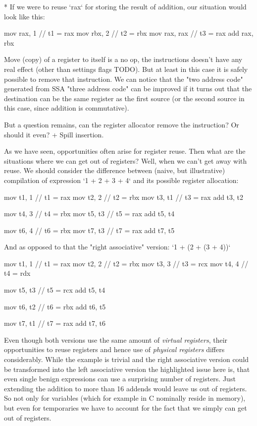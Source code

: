 * If we were to reuse `rax` for storing the result of addition, our situation
would look like this:

\begtt
mov rax, 1   // t1 = rax
mov rbx, 2   // t2 = rbx
mov rax, rax // t3 = rax
add rax, rbx
\endtt

Move (copy) of a register to itself is a no op, the instructions doesn't have
any real effect (other than settings flags TODO). But at least in this case it
is safely possible to remove that instruction. We can notice that the "two
address code" generated from SSA "three address code" can be improved if it
turns out that the destination can be the same register as the first source (or
the second source in this case, since addition is commutative).

But a question remains, can the register allocator remove the instruction?
Or should it even? + Spill insertion.
\enditems

As we have seen, opportunities often arise for register reuse. Then what are the
situations where we can get out of registers? Well, when we can't get away with
reuse. We should consider the difference between (naive, but illustrative)
compilation of expression `1 + 2 + 3 + 4` and its possible register allocation:

\begtt
mov t1, 1  // t1 = rax
mov t2, 2  // t2 = rbx
mov t3, t1 // t3 = rax
add t3, t2

mov t4, 3  // t4 = rbx
mov t5, t3 // t5 = rax
add t5, t4

mov t6, 4  // t6 = rbx
mov t7, t3 // t7 = rax
add t7, t5
\endtt

And as opposed to that the "right associative" version: `1 + (2 + (3 + 4))`

\begtt
mov t1, 1  // t1 = rax
mov t2, 2  // t2 = rbx
mov t3, 3  // t3 = rcx
mov t4, 4  // t4 = rdx

mov t5, t3 // t5 = rcx
add t5, t4

mov t6, t2 // t6 = rbx
add t6, t5

mov t7, t1 // t7 = rax
add t7, t6
\endtt

Even though both versions use the same amount of {\em virtual registers}, their
opportunities to reuse registers and hence use of {\em physical registers}
differs considerably. While the example is trivial and the right associative
version could be transformed into the left associative version the highlighted
issue here is, that even single benign expressions can use a surprising number of
registers. Just extending the addition to more than 16 addends would leave us
out of registers. So not only for variables (which for example in C nominally
reside in memory), but even for temporaries we have to account for the fact that
we simply can get out of registers.

